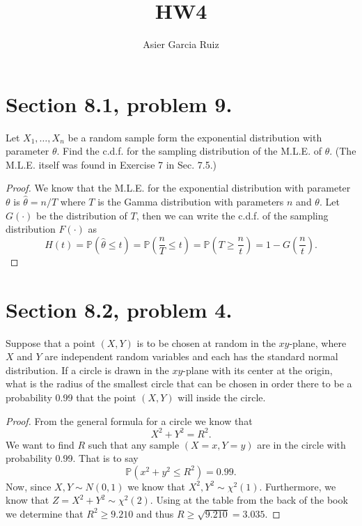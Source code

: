 \documentclass{article}
\title{HW4}
\author{Asier Garcia Ruiz}
\renewcommand{\P}[1]{\mathbb{P}\left(#1\right)}
\newcommand{\randsamp}{X_1,\dots,X_n}
\newcommand{\cdf}{c.d.f. }
\newcommand{\mle}{M.L.E. }
\newenvironment{hwproof}[1]
{
    #1
    \begin{proof}
}{
    \end{proof}
}
\begin{document}
\maketitle

\section{Section 8.1, problem 9.}
\begin{hwproof}
    {
        Let $\randsamp$ be a random sample form the exponential distribution with
        parameter $\theta$. Find the \cdf for the sampling distribution of the
        \mle of $\theta$. (The \mle itself was found in Exercise 7 in Sec. 7.5.)
    }

    We know that the \mle for the exponential distribution with parameter $\theta$
    is $\hat{\theta} = n / T$ where $T$ is the Gamma distribution with parameters
    $n$ and $\theta$. Let $G(\cdot)$ be the distribution of $T$, then we can write
    the \cdf of the sampling distribution $F(\cdot)$ as
    \begin{equation*}
        H(t) = \P{\hat{\theta} \leq t} = \P{\frac{n}{T} \leq t}
        = \P{T \geq \frac{n}{t} } = 1 - G\left(\frac{n}{t}\right).
    \end{equation*}
\end{hwproof}

\section{Section 8.2, problem 4.}
\begin{hwproof}
    {
        Suppose that a point $(X,Y)$ is to be chosen at random in the $xy$-plane,
        where $X$ and $Y$ are independent random variables and each has the standard
        normal distribution. If a circle is drawn in the $xy$-plane with its center
        at the origin, what is the radius of the smallest circle that can be chosen
        in order there to be a probability 0.99 that the point $(X,Y)$ will inside
        the circle.
    }
    From the general formula for a circle we know that
    \begin{equation*}
        X^2 + Y^2 = R^2.
    \end{equation*}
    We want to find $R$ such that any sample $(X=x, Y=y)$ are in the circle with
    probability 0.99. That is to say
    \begin{equation*}
        \P{x^2 + y^2 \leq R^2} = 0.99.
    \end{equation*}
    Now, since $X, Y \sim N(0,1)$ we know that $X^2, Y^2 \sim \chi^2(1)$.
    Furthermore, we know that $Z = X^2 + Y^2 \sim \chi^2(2)$. Using at the table
    from the back of the book we determine that $R^2 \geq 9.210$ and thus
    $R \geq \sqrt{9.210} = 3.035$.
\end{hwproof}
\end{document}
